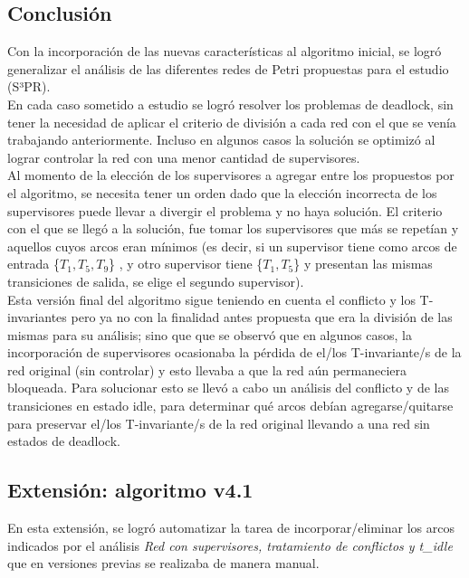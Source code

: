\subsection{Conclusión}
Con la incorporación de las nuevas características al algoritmo inicial, se logró generalizar el análisis de las diferentes redes de Petri propuestas para el estudio (S³PR). \\
En cada caso sometido a estudio se logró resolver los problemas de deadlock, sin tener la necesidad de aplicar el criterio de división a cada red con el que se venía trabajando anteriormente. Incluso en algunos casos la solución se optimizó al lograr controlar la red con una menor cantidad de supervisores. \\
Al momento de la elección de los supervisores a agregar entre los propuestos por el algoritmo, se necesita tener un orden dado que la elección incorrecta de los supervisores puede llevar a divergir el problema y no haya solución. El criterio con el que se llegó a la solución, fue tomar los supervisores que más se repetían y aquellos cuyos arcos eran mínimos (es decir, si un supervisor tiene como arcos de entrada \{$T_1,T_5,T_9$\} , y otro supervisor tiene \{$T_1, T_5$\} y presentan las mismas transiciones de salida, se elige el segundo supervisor). \\
Esta versión final del algoritmo sigue teniendo en cuenta el conflicto y los \break T-invariantes pero ya no con la finalidad antes propuesta que era la división de las mismas para su análisis; sino que que se observó que en algunos casos, la incorporación de  supervisores ocasionaba la pérdida de el/los T-invariante/s de la red original (sin controlar) y esto llevaba a que la red aún permaneciera bloqueada. Para solucionar esto se llevó a cabo un análisis del conflicto y de las transiciones en estado idle, para determinar qué arcos debían agregarse/quitarse para preservar el/los T-invariante/s de la red original llevando a una red sin estados de deadlock.

\subsection{Extensión: algoritmo v4.1}
En esta extensión, se logró automatizar la tarea de incorporar/eliminar los arcos indicados por el análisis \textit{Red  con supervisores, tratamiento de conflictos y t\_idle} que en versiones previas se realizaba de manera manual.
\bigskip

